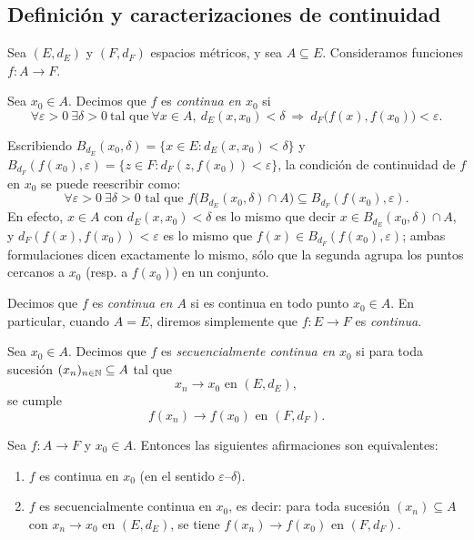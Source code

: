 \subsection{Definición y caracterizaciones de continuidad}

Sea $(E,d_E)$ y $(F,d_F)$ espacios métricos, y sea $A \subseteq E$.
Consideramos funciones $f : A \to F$.

\begin{defi}
Sea $x_0 \in A$. Decimos que $f$ es \emph{continua en $x_0$} si
\[
\forall \varepsilon > 0\ \exists \delta > 0\ \text{tal que}\
\forall x \in A,\ d_E(x,x_0) < \delta \ \Rightarrow\ d_F\bigl(f(x),f(x_0)\bigr) < \varepsilon.
\]
\end{defi}

\begin{obs}
Escribiendo $B_{d_E}(x_0,\delta) = \{x\in E : d_E(x,x_0)<\delta\}$ y
$B_{d_F}(f(x_0),\varepsilon) = \{z\in F : d_F(z,f(x_0))<\varepsilon\}$, la
condición de continuidad de $f$ en $x_0$ se puede reescribir como:
\[
\forall \varepsilon>0\ \exists \delta>0 \text{ tal que }
f\bigl(B_{d_E}(x_0,\delta)\cap A\bigr) \subseteq B_{d_F}(f(x_0),\varepsilon).
\]
En efecto, $x\in A$ con $d_E(x,x_0)<\delta$ es lo mismo que decir
$x\in B_{d_E}(x_0,\delta)\cap A$, y $d_F(f(x),f(x_0))<\varepsilon$ es lo
mismo que $f(x)\in B_{d_F}(f(x_0),\varepsilon)$; ambas formulaciones dicen
exactamente lo mismo, sólo que la segunda agrupa los puntos cercanos a
$x_0$ (resp. a $f(x_0)$) en un conjunto.
\end{obs}

\begin{defi}
Decimos que $f$ es \emph{continua en $A$} si es continua en todo punto
$x_0 \in A$. En particular, cuando $A = E$, diremos simplemente que
$f : E \to F$ es \emph{continua}.
\end{defi}

\begin{defi}
Sea $x_0 \in A$. Decimos que $f$ es \emph{secuencialmente continua en $x_0$}
si para toda sucesión $(x_n)_{n\in\mathbb{N}} \subseteq A$ tal que
\[
x_n \to x_0 \text{ en } (E,d_E),
\]
se cumple
\[
f(x_n) \to f(x_0) \text{ en } (F,d_F).
\]
\end{defi}

\begin{prop}
Sea $f : A \to F$ y $x_0 \in A$. Entonces las siguientes afirmaciones
son equivalentes:
\begin{enumerate}[label=(\roman*)]
    \item $f$ es continua en $x_0$ (en el sentido $\varepsilon$--$\delta$).
    \item $f$ es secuencialmente continua en $x_0$, es decir:
    para toda sucesión $(x_n) \subseteq A$ con $x_n \to x_0$ en $(E,d_E)$,
    se tiene $f(x_n) \to f(x_0)$ en $(F,d_F)$.
\end{enumerate}
\end{prop}

